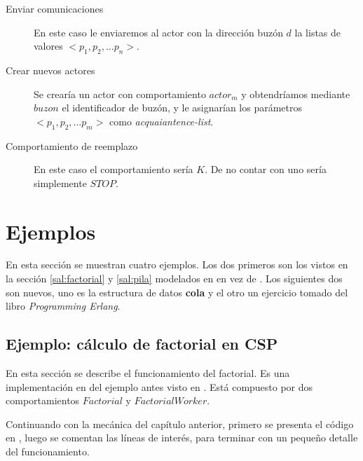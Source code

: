 \begin{description}
\item [Enviar comunicaciones] En este caso le enviaremos al actor con la dirección buzón $d$ la listas de valores $<p_1, p_2, \ldots p_n>$. 
\item [Crear nuevos actores] Se crearía un actor con comportamiento $actor_m$ y obtendríamos mediante $buzon$ el identificador de buzón, y le asignarían los parámetros $<p_1, p_2, \ldots p_m>$ como \textit{acquaiantence-list}.
\item [Comportamiento de reemplazo] En este caso el comportamiento sería $K$. De no contar con uno sería simplemente $STOP$.
\end{description}

\section{Ejemplos}

En esta sección se muestran cuatro ejemplos. Los dos primeros son los vistos en la sección \ref{sal:factorial} y \ref{sal:pila} modelados en \CSP en vez de \SAL. Los siguientes dos son nuevos, uno es la estructura de datos \textbf{cola} y el otro un ejercicio tomado del libro \textit{Programming Erlang}\cite{Cesarini:2009:EP:1717841}.

\subsection{Ejemplo: cálculo de factorial en CSP}
En esta sección se describe el funcionamiento del factorial. Es una implementación en \CSP del ejemplo antes visto en \SAL. Está compuesto por dos comportamientos $Factorial$ y $FactorialWorker$.

Continuando con la mecánica del capítulo anterior, primero se presenta el código en \CSP, luego se comentan las líneas de interés, para terminar con un pequeño detalle del funcionamiento.

